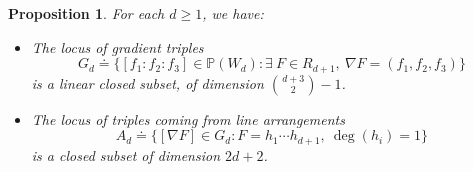 \documentclass[11pt]{amsart} %
\newtheorem{Proposition}[Theorem]{Proposition}
\theoremstyle{definition}
\begin{document}
\begin{Proposition}\label{prop:parameter-space-gradient}
For each $d \geq 1$, we have:
\begin{itemize}
    \item[(a)] The locus of gradient triples
    $$
    G_d \doteq \{[f_1:f_2:f_3] \in \mathbb{P}(W_d) : \exists \ F \in R_{d+1} , \ \nabla F = (f_1, f_2, f_3)\}
    $$
    is a linear closed subset, of dimension $\binom{d+3}{2}-1$.

    \item[(b)] The locus of triples coming from line arrangements
    $$
    A_d \doteq \{[\nabla F] \in G_d : F = h_1 \cdots h_{d+1}, \ \deg(h_i) = 1\}
    $$
    is a closed subset of dimension $2d+2$.
\end{itemize}
\end{Proposition}
\end{document}
